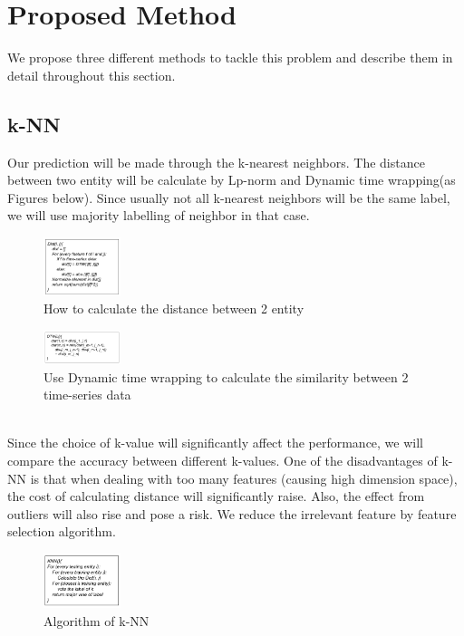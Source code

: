 \documentclass[acmtog, authorversion]{acmart}
\begin{document}
\section{Proposed Method}
We propose three different methods to tackle this problem and describe them in detail throughout this section.
\subsection{k-NN}
Our prediction will be made through the k-nearest neighbors. The distance between two entity will be calculate by Lp-norm and Dynamic time wrapping(as Figures below). Since usually not all k-nearest neighbors will be the same label, we will use majority labelling of neighbor in that case. 
\begin{figure}[h!]
  \centering
  \includegraphics[width=0.2\textwidth]{dist}
  \caption{How to calculate the distance between 2 entity}
  \end{figure}
\begin{figure}[h!]
  \centering
  \includegraphics[width=0.2\textwidth]{dtw}
  \caption{Use Dynamic time wrapping to calculate the similarity between 2 time-series data}
  \end{figure}
\\Since the choice of k-value will significantly affect the performance, we will compare the accuracy between different k-values. One of the disadvantages of k-NN is that when dealing with too many features (causing high dimension space), the cost of calculating distance will significantly raise. Also, the effect from outliers will also rise and pose a risk. We reduce the irrelevant feature by feature selection algorithm.
\begin{figure}[h!]
  \centering
  \includegraphics[width=0.2\textwidth]{knn}
  \caption{Algorithm of k-NN}
  \end{figure}
  
\end{document}
